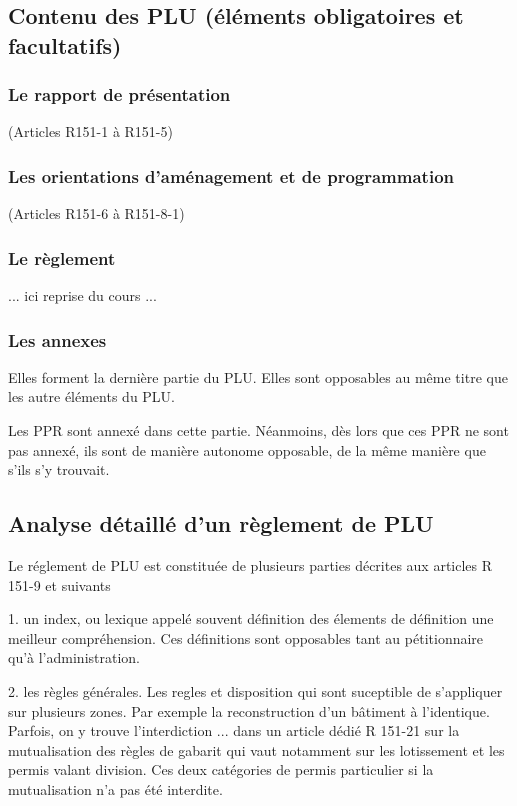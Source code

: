 	\subsection{Contenu des PLU (éléments obligatoires et facultatifs)}

		\subsubsection{Le rapport de présentation} (Articles R151-1 à R151-5)


		\subsubsection{Les orientations d'aménagement et de programmation}
		(Articles R151-6 à R151-8-1)

		\subsubsection{Le règlement}

		... ici reprise du cours ...

		\subsubsection{Les annexes}

		Elles forment la dernière partie du PLU. Elles sont opposables au même titre que les autre éléments du PLU.

		Les PPR sont annexé dans cette partie. Néanmoins, dès lors que ces PPR ne sont pas annexé, ils sont de manière autonome opposable, de la même manière que s'ils s'y trouvait.

	\subsection{Analyse détaillé d'un règlement de PLU}

		Le réglement de PLU est constituée de plusieurs parties décrites aux articles R 151-9 et suivants

		1. un index, ou lexique appelé souvent définition des élements de définition une meilleur compréhension. Ces définitions sont opposables tant au pétitionnaire qu'à l'administration.

		2. les règles générales. Les regles et disposition qui sont suceptible de s'appliquer sur plusieurs zones. Par exemple la reconstruction d'un bâtiment à l'identique. Parfois, on y trouve l'interdiction ... dans un article dédié
		R 151-21 sur la mutualisation des règles de gabarit qui vaut notamment sur les lotissement et les permis valant division. Ces deux catégories de permis particulier si la mutualisation n'a pas été interdite.

